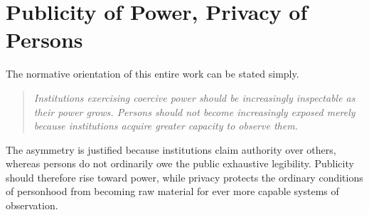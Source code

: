 
\chapter{Publicity of Power, Privacy of Persons}
\label{ch:ch108}

The normative orientation of this entire work can be stated simply.

\begin{quote}
\emph{Institutions exercising coercive power should be increasingly inspectable as their power grows. Persons should not become increasingly exposed merely because institutions acquire greater capacity to observe them.}
\end{quote}

The asymmetry is justified because institutions claim authority over others, whereas persons do not ordinarily owe the public exhaustive legibility. Publicity should therefore rise toward power, while privacy protects the ordinary conditions of personhood from becoming raw material for ever more capable systems of observation.
